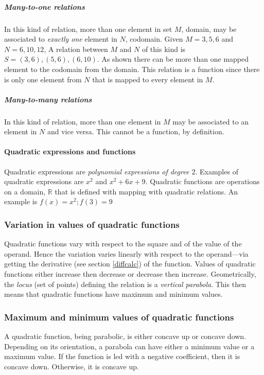 \subparagraph{Many-to-one relations}
In this kind of relation, more than one element in set $M$, domain, may be associated to \emph{exactly one} element in $N$, codomain.
Given $M = {3, 5, 6}$ and $N = {6, 10, 12}$,
A relation between $M$ and $N$ of this kind is $S = {(3, 6), (5, 6), (6, 10)}$.
As shown there can be more than one mapped element to the codomain from the domain.
This relation is a function since there is only one element from $N$ that is mapped to every element in $M$.

\subparagraph{Many-to-many relations}
In this kind of relation, more than one element in $M$ may be associated to an element in $N$ and vice versa.
This cannot be a function, by definition.

\paragraph{Quadratic expressions and functions}
Quadratic expressions are \emph{polynomial expressions of degree $2$}.
Examples of quadratic expressions are $x^2$ and $x^2+6x+9$.
Quadratic functions are operations on a domain, $\mathbb{R}$ that is defined with mapping with quadratic relations.
An example is $f(x) = x^2; f(3) = 9$

\subsubsection{Variation in values of quadratic functions}
Quadratic functions vary with respect to the square and of the value of the operand.
Hence the variation varies linearly with respect to the operand---via getting the derivative (see section \ref{diffcalc}) of the function.
Values of quadratic functions either increase then decrease or decrease then increase.
Geometrically, the \emph{locus} (set of points) defining the relation is a \emph{vertical parabola}.
This then means that quadratic functions have maximum and minimum values.

\subsubsection{Maximum and minimum values of quadratic functions}
A quadratic function, being parabolic, is either concave up or concave down.
Depending on its orientation, a parabola can have either a minimum value or a maximum value.
If the function is led with a negative coefficient, then it is concave down.
Otherwise, it is concave up.

